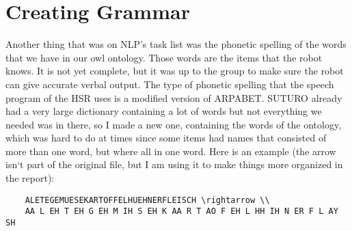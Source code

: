 \documentclass[main.tex]{subfiles}
\begin{document}
	\section{Creating Grammar}
	Another thing that was on NLP's task list was the phonetic spelling of the words that we have in our owl ontology. Those words are the items that the robot knows. It is not yet complete, but it was up to the group to make sure the robot can give accurate verbal output. The type of phonetic spelling that the speech program of the HSR uses is a modified version of ARPABET. SUTURO already had a very large dictionary containing a lot of words but not everything we needed was  in there, so I made a new one, containing the words of the ontology, which was hard to do at times since some items had names that consisted of more than one word, but where all in one word. Here is an example (the arrow isn‘t part of the original file, but I am using it to make things more organized in the report):

	\begin{verbatim}
	ALETEGEMUESEKARTOFFELHUEHNERFLEISCH \rightarrow \\
	AA L EH T EH G EH M IH S EH K AA R T AO F EH L HH IH N ER F L AY SH
	\end{verbatim}
		\endgroup
\end{document}
